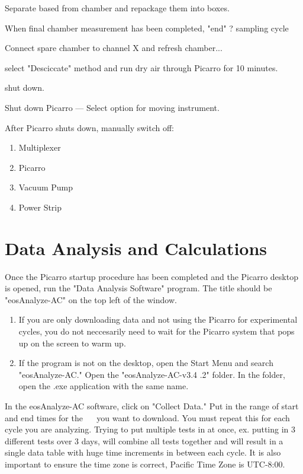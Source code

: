 \documentclass[12pt]{../SOP3}\usepackage[]{graphicx}\usepackage[]{color}
\begin{document}
\NP Separate based from chamber and repackage them into boxes.
                               
\NP When final chamber measurement has been completed, "end" ? sampling cycle
                               
\NP Connect spare chamber to channel X and refresh chamber... 
                               
\NP select "Desciccate" method and run dry air through Picarro for 10 minutes.
                               
\NP shut down.
                               
\NP Shut down Picarro --- Select option for moving instrument.
                               
\NP After Picarro shuts down, manually switch off:

\begin{enumerate}
  \item Multiplexer
  \item Picarro
  \item Vacuum Pump
  \item Power Strip
\end{enumerate}
                               
\section{Data Analysis and Calculations}

\NP Once the Picarro startup procedure has been completed and the Picarro desktop is opened, run the "Data Analysis Software" program. The title should be "eosAnalyze-AC" on the top left of the window. 

\begin{enumerate}[label=(\alph*)]
  \item If you are only downloading data and not using the Picarro for experimental cycles, you do not neccesarily need to        wait for the Picarro system that pops up on the screen to warm up. 
    \item If the program is not on the desktop, open the Start Menu and search "eosAnalyze-AC." Open the "eosAnalyze-AC-v3.4     .2" folder. In the folder, open the .exe application with the same name. 
    
\end{enumerate}

\NP In the eosAnalyze-AC software, click on "Collect Data." Put in the range of start and end times for the ~~ you want to download. You must repeat this for each cycle you are analyzing. Trying to put multiple tests in at once, ex. putting in 3 different tests over 3 days, will combine all tests together and will result in a single data table with huge time increments in between each cycle. It is also important to ensure the time zone is correct, Pacific Time Zone is UTC-8:00.
\end{document}
